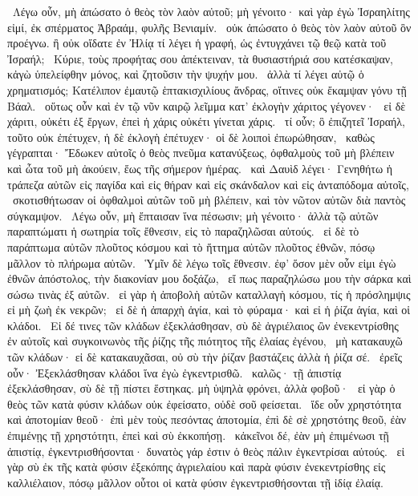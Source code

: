 ~Λέγω οὖν, μὴ ἀπώσατο ὁ θεὸς τὸν λαὸν αὐτοῦ; μὴ γένοιτο· καὶ γὰρ ἐγὼ Ἰσραηλίτης εἰμί, ἐκ σπέρματος Ἀβραάμ, φυλῆς Βενιαμίν.
~οὐκ ἀπώσατο ὁ θεὸς τὸν λαὸν αὐτοῦ ὃν προέγνω. ἢ οὐκ οἴδατε ἐν Ἠλίᾳ τί λέγει ἡ γραφή, ὡς ἐντυγχάνει τῷ θεῷ κατὰ τοῦ Ἰσραήλ;
~Κύριε, τοὺς προφήτας σου ἀπέκτειναν, τὰ θυσιαστήριά σου κατέσκαψαν, κἀγὼ ὑπελείφθην μόνος, καὶ ζητοῦσιν τὴν ψυχήν μου.
~ἀλλὰ τί λέγει αὐτῷ ὁ χρηματισμός; Κατέλιπον ἐμαυτῷ ἑπτακισχιλίους ἄνδρας, οἵτινες οὐκ ἔκαμψαν γόνυ τῇ Βάαλ.
~οὕτως οὖν καὶ ἐν τῷ νῦν καιρῷ λεῖμμα κατ’ ἐκλογὴν χάριτος γέγονεν·
~εἰ δὲ χάριτι, οὐκέτι ἐξ ἔργων, ἐπεὶ ἡ χάρις οὐκέτι γίνεται χάρις.
~τί οὖν; ὃ ἐπιζητεῖ Ἰσραήλ, τοῦτο οὐκ ἐπέτυχεν, ἡ δὲ ἐκλογὴ ἐπέτυχεν· οἱ δὲ λοιποὶ ἐπωρώθησαν,
~καθὼς γέγραπται· Ἔδωκεν αὐτοῖς ὁ θεὸς πνεῦμα κατανύξεως, ὀφθαλμοὺς τοῦ μὴ βλέπειν καὶ ὦτα τοῦ μὴ ἀκούειν, ἕως τῆς σήμερον ἡμέρας.
~καὶ Δαυὶδ λέγει· Γενηθήτω ἡ τράπεζα αὐτῶν εἰς παγίδα καὶ εἰς θήραν καὶ εἰς σκάνδαλον καὶ εἰς ἀνταπόδομα αὐτοῖς,
~σκοτισθήτωσαν οἱ ὀφθαλμοὶ αὐτῶν τοῦ μὴ βλέπειν, καὶ τὸν νῶτον αὐτῶν διὰ παντὸς σύγκαμψον.
~Λέγω οὖν, μὴ ἔπταισαν ἵνα πέσωσιν; μὴ γένοιτο· ἀλλὰ τῷ αὐτῶν παραπτώματι ἡ σωτηρία τοῖς ἔθνεσιν, εἰς τὸ παραζηλῶσαι αὐτούς.
~εἰ δὲ τὸ παράπτωμα αὐτῶν πλοῦτος κόσμου καὶ τὸ ἥττημα αὐτῶν πλοῦτος ἐθνῶν, πόσῳ μᾶλλον τὸ πλήρωμα αὐτῶν.
~Ὑμῖν δὲ λέγω τοῖς ἔθνεσιν. ἐφ’ ὅσον μὲν οὖν εἰμι ἐγὼ ἐθνῶν ἀπόστολος, τὴν διακονίαν μου δοξάζω,
~εἴ πως παραζηλώσω μου τὴν σάρκα καὶ σώσω τινὰς ἐξ αὐτῶν.
~εἰ γὰρ ἡ ἀποβολὴ αὐτῶν καταλλαγὴ κόσμου, τίς ἡ πρόσλημψις εἰ μὴ ζωὴ ἐκ νεκρῶν;
~εἰ δὲ ἡ ἀπαρχὴ ἁγία, καὶ τὸ φύραμα· καὶ εἰ ἡ ῥίζα ἁγία, καὶ οἱ κλάδοι.
~Εἰ δέ τινες τῶν κλάδων ἐξεκλάσθησαν, σὺ δὲ ἀγριέλαιος ὢν ἐνεκεντρίσθης ἐν αὐτοῖς καὶ συγκοινωνὸς τῆς ῥίζης τῆς πιότητος τῆς ἐλαίας ἐγένου,
~μὴ κατακαυχῶ τῶν κλάδων· εἰ δὲ κατακαυχᾶσαι, οὐ σὺ τὴν ῥίζαν βαστάζεις ἀλλὰ ἡ ῥίζα σέ.
~ἐρεῖς οὖν· Ἐξεκλάσθησαν κλάδοι ἵνα ἐγὼ ἐγκεντρισθῶ.
~καλῶς· τῇ ἀπιστίᾳ ἐξεκλάσθησαν, σὺ δὲ τῇ πίστει ἕστηκας. μὴ ὑψηλὰ φρόνει, ἀλλὰ φοβοῦ·
~εἰ γὰρ ὁ θεὸς τῶν κατὰ φύσιν κλάδων οὐκ ἐφείσατο, οὐδὲ σοῦ φείσεται.
~ἴδε οὖν χρηστότητα καὶ ἀποτομίαν θεοῦ· ἐπὶ μὲν τοὺς πεσόντας ἀποτομία, ἐπὶ δὲ σὲ χρηστότης θεοῦ, ἐὰν ἐπιμένῃς τῇ χρηστότητι, ἐπεὶ καὶ σὺ ἐκκοπήσῃ.
~κἀκεῖνοι δέ, ἐὰν μὴ ἐπιμένωσι τῇ ἀπιστίᾳ, ἐγκεντρισθήσονται· δυνατὸς γάρ ἐστιν ὁ θεὸς πάλιν ἐγκεντρίσαι αὐτούς.
~εἰ γὰρ σὺ ἐκ τῆς κατὰ φύσιν ἐξεκόπης ἀγριελαίου καὶ παρὰ φύσιν ἐνεκεντρίσθης εἰς καλλιέλαιον, πόσῳ μᾶλλον οὗτοι οἱ κατὰ φύσιν ἐγκεντρισθήσονται τῇ ἰδίᾳ ἐλαίᾳ.
